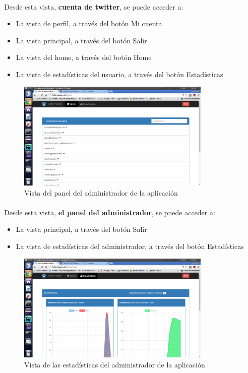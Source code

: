 \documentclass[a4paper]{article}
\begin{document}
\paragraph{} Desde esta vista, \textbf{cuenta de twitter}, se puede acceder a:
\begin{itemize}
	\item La vista de perfil, a través del botón Mi cuenta
	\item La vista principal, a través del botón Salir
	\item La vista del home, a través del botón Home
	\item La vista de estadísticas del usuario, a través del botón Estadísticas
\end{itemize}
\begin{figure}[H]
	\centering
	\includegraphics[width=350px]{img/admin.png}
	\caption{Vista del panel del administrador de la aplicación}
	\label{fig:diagarq}
\end{figure}
\paragraph{} Desde esta vista, \textbf{el panel del administrador}, se puede acceder a:
\begin{itemize}
	\item La vista principal, a través del botón Salir
	\item La vista de estadísticas del administrador, a través del botón Estadísticas
\end{itemize}
\begin{figure}[H]
	\centering
	\includegraphics[width=350px]{img/estadisticasadmin.png}
	\caption{Vista de las estadísticas del administrador de la aplicación}
	\label{fig:diagarq}
\end{figure}
\end{document}
